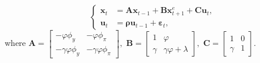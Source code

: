 \begin{equation}\label{nkmodelmlag}
    \left\{
    \begin{split}
          {\pmb x}_t&={\pmb A} {\pmb x}_{t-1}+{\pmb B} {\pmb x}_{t+1}^e+{\pmb C}\pmb{u}_t,\\
          \pmb{u}_t&={\pmb\rho}\pmb{u}_{t-1}+\pmb{\varepsilon}_t,
    \end{split}
    \right.
\end{equation}
where ${\pmb A}=\left[\begin{array}{cc}
-\varphi\phi_y&-\varphi\phi_\pi\\
-\gamma\varphi\phi_y&-\gamma\varphi\phi_\pi
\end{array}\right],\,\,{\pmb B}=\left[\begin{array}{cc}
1&\varphi\\
\gamma&\gamma\varphi+\lambda
\end{array}\right],\,\,{\pmb C}=\left[\begin{array}{cc} 1&0\\
\gamma&1
\end{array}\right].$

